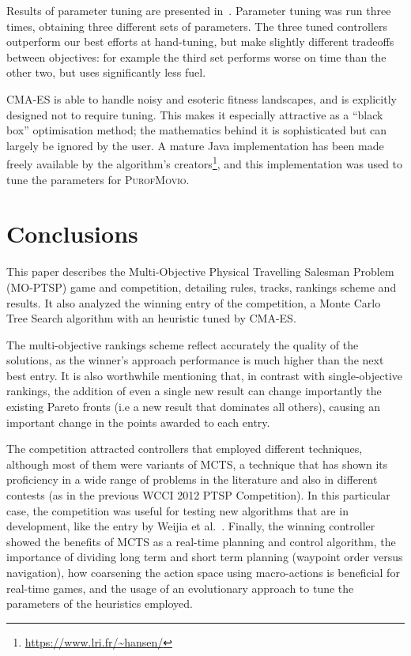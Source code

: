 \documentclass[conference]{IEEEtran}
\begin{document}
Results of parameter tuning are presented in~\cite{Powley2013_moptsp}.
Parameter tuning was run three times, obtaining three different sets of parameters.
The three tuned controllers outperform our best efforts at hand-tuning,
but make slightly different tradeoffs between objectives:
for example the third set performs worse on time than the other two, but uses significantly less fuel.

CMA-ES is able to handle noisy and esoteric fitness landscapes, and is explicitly designed not to require tuning.
This makes it especially attractive as a ``black box'' optimisation method;
the mathematics behind it is sophisticated but can largely be ignored by the user.
A mature Java implementation has been made freely available by the algorithm's creators\footnote{\url{https://www.lri.fr/~hansen/}},
and this implementation was used to tune the parameters for \textsc{PurofMovio}.

\section{Conclusions} \label{sec:conc}

This paper describes the Multi-Objective Physical Travelling Salesman Problem (MO-PTSP) game and competition, detailing rules, tracks, rankings scheme and results. It also analyzed the winning entry of the competition, a Monte Carlo Tree Search algorithm with an heuristic tuned by CMA-ES.  

The multi-objective rankings scheme reflect accurately the quality of the solutions, as the winner's approach performance is much higher than the next best entry. It is also worthwhile mentioning that, in contrast with single-objective rankings, the addition of even a single new result can change importantly the existing Pareto fronts (i.e a new result that dominates all others), causing an important change in the points awarded to each entry.

The competition attracted controllers that employed different techniques, although most of them were variants of MCTS, a technique that has shown its proficiency in a wide range of problems in the literature and also in different contests (as in the previous WCCI 2012 PTSP Competition). In this particular case, the competition was useful for testing new algorithms that are in development, like the entry by Weijia et al.~\cite{Wang13}. Finally, the winning controller showed the benefits of MCTS as a real-time planning and control algorithm, the importance of dividing long term and short term planning (waypoint order versus navigation), how coarsening the action space using macro-actions is beneficial for real-time games, and the usage of an evolutionary approach to tune the parameters of the heuristics employed.




\end{document}
